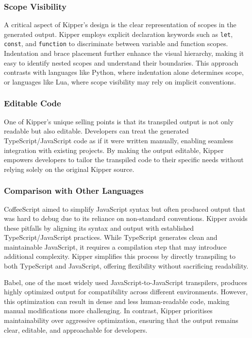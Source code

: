 \subsubsection{Scope Visibility}

A critical aspect of Kipper's design is the clear representation of scopes in the generated output. Kipper employs explicit declaration keywords such as \lstinline|let|, \lstinline|const|, and \lstinline|function| to discriminate between variable and function scopes. Indentation and brace placement further enhance the visual hierarchy, making it easy to identify nested scopes and understand their boundaries. This approach contrasts with languages like Python, where indentation alone determines scope, or languages like Lua, where scope visibility may rely on implicit conventions.

\subsubsection{Editable Code}

One of Kipper's unique selling points is that its \gls{transpile}d output is not only readable but also editable. Developers can treat the generated TypeScript/JavaScript code as if it were written manually, enabling seamless integration with existing projects. By making the output editable, Kipper empowers developers to tailor the \gls{transpile}d code to their specific needs without relying solely on the original Kipper source.

\subsubsection{Comparison with Other Languages}

CoffeeScript aimed to simplify JavaScript syntax but often produced output that was hard to debug due to its reliance on non-standard conventions. Kipper avoids these pitfalls by aligning its syntax and output with established TypeScript/JavaScript practices. While TypeScript generates clean and maintainable JavaScript, it requires a compilation step that may introduce additional complexity. Kipper simplifies this process by directly transpiling to both TypeScript and JavaScript, offering flexibility without sacrificing readability. 

Babel, one of the most widely used JavaScript-to-JavaScript \gls{transpiler}s, produces highly optimized output for compatibility across different environments. However, this optimization can result in dense and less human-readable code, making manual modifications more challenging. In contrast, Kipper prioritises maintainability over aggressive optimization, ensuring that the output remains clear, editable, and approachable for developers.

